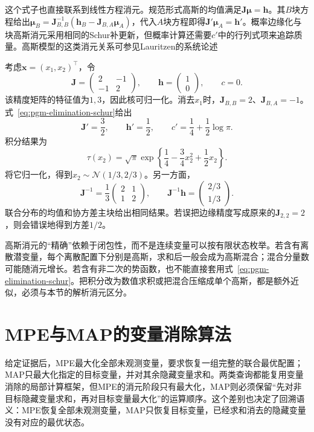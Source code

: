 这个式子也直接联系到线性方程消元。规范形式高斯的均值满足$\bm{J}\bm{\mu}=\bm{h}$。其$B$块方程给出$\bm{\mu}_B=\bm{J}_{B,B}^{-1}(\bm{h}_B-\bm{J}_{B,A}\bm{\mu}_A)$，代入$A$块方程即得$\bm{J}'\bm{\mu}_A=\bm{h}'$。概率边缘化与块高斯消元采用相同的Schur补更新，但概率计算还需要$c'$中的行列式项来追踪质量。高斯模型的这类消元关系可参见Lauritzen的系统论述

\begin{example}[一个二维高斯核的积分]
  \label{ex:pgm-elimination-gaussian-numeric}
  考虑$\bm{x}=(x_1,x_2)^{\top}$，令
  \[
    \bm{J}=\begin{pmatrix}2&-1\\-1&2\end{pmatrix},
    \qquad
    \bm{h}=\begin{pmatrix}1\\0\end{pmatrix},
    \qquad c=0.
  \]
  该精度矩阵的特征值为$1,3$，因此核可归一化。消去$x_1$时，$\bm{J}_{B,B}=2$、$\bm{J}_{B,A}=-1$。式~\eqref{eq:pgm-elimination-schur}给出
  \[
    \bm{J}'=\frac32,\qquad \bm{h}'=\frac12,\qquad
    c'=\frac14+\frac12\log\pi.
  \]
  积分结果为
  \[
    \tau(x_2)=\sqrt{\pi}\exp\!\left\{
      \frac14-\frac34x_2^2+\frac12x_2\right\}.
  \]
  将它归一化，得到$x_2\sim\mathcal{N}(1/3,2/3)$。另一方面，
  \[
    \bm{J}^{-1}=\frac13
      \begin{pmatrix}2&1\\1&2\end{pmatrix},
    \qquad
    \bm{J}^{-1}\bm{h}=
      \begin{pmatrix}2/3\\1/3\end{pmatrix}.
  \]
  联合分布的均值和协方差主块给出相同结果。若误把边缘精度写成原来的$\bm{J}_{2,2}=2$，则会错误地得到方差$1/2$。
\end{example}

高斯消元的“精确”依赖于闭包性，而不是连续变量可以按有限状态枚举。若含有离散潜变量，每个离散配置下分别是高斯，求和后一般会成为高斯混合；混合分量数可能随消元增长。若含有非二次的势函数，也不能直接套用式~\eqref{eq:pgm-elimination-schur}。把积分改为数值求积或把混合压缩成单个高斯，都是额外近似，必须与本节的解析消元区分。

\section{MPE与MAP的变量消除算法}
\label{sec:pgm-elimination-max-product}

给定证据后，MPE最大化全部未观测变量，要求恢复一组完整的联合最优配置；MAP只最大化指定的目标变量，并对其余隐藏变量求和。两类查询都能复用变量消除的局部计算框架，但MPE的消元阶段只有最大化，MAP则必须保留“先对非目标隐藏变量求和，再对目标变量最大化”的运算顺序。这个差别也决定了回溯语义：MPE恢复全部未观测变量，MAP只恢复目标变量，已经求和消去的隐藏变量没有对应的最优状态。

